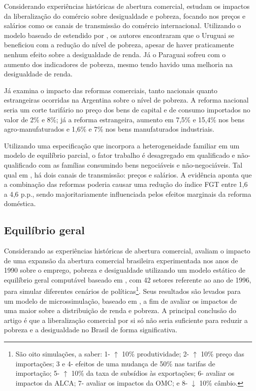 Considerando experiências históricas de abertura comercial, \textcite{borrazetal12} estudam os impactos da liberalização do comércio sobre desigualdade e pobreza, focando nos preços e salários como os canais de transmissão do comércio internacional. Utilizando o modelo baseado de \textcite{dixit80} estendido por \textcite{porto06}, os autores encontraram que o Uruguai se beneficiou com a redução do nível de pobreza, apesar de haver praticamente nenhum efeito sobre a desigualdade de renda. Já o Paraguai sofreu com o aumento dos indicadores de pobreza, mesmo tendo havido uma melhoria na desigualdade de renda.

Já \textcite{porto03} examina o impacto das reformas comerciais, tanto nacionais quanto estrangeiras ocorridas na Argentina sobre o nível de pobreza. A reforma nacional seria um corte tarifário no preço dos bens de capital e de consumo importados no valor de 2\% e 8\%; já a reforma estrangeira, aumento em 7,5\% e 15,4\% nos bens agro-manufaturados e 1,6\% e 7\% nos bens manufaturados industriais.

Utilizando uma especificação que incorpora a heterogeneidade familiar em um modelo de equilíbrio parcial, o fator trabalho é desagregado em qualificado e não-qualificado com as famílias consumindo bens negociáveis e não-negociáveis. Tal qual em \textcite{borrazetal12}, há dois canais de transmissão: preços e salários. A evidência aponta que a combinação das reformas poderia causar uma redução do índice FGT entre 1,6 a 4,6 p.p., sendo majoritariamente influenciada pelos efeitos marginais da reforma doméstica.

\subsection{Equilíbrio geral} \label{subsec:eq_geral}

Considerando as experiências históricas de abertura comercial, \textcite{carneiro06} avaliam o impacto de uma expansão da abertura comercial brasileira experimentada nos anos de 1990 sobre o emprego, pobreza e desigualdade utilizando um modelo estático de equilíbrio geral computável baseado em \textcite{robinson99}, com 42 setores referente ao ano de 1996, para simular diferentes cenários de políticas\footnote{São oito simulações, a saber: 1- $\uparrow$ 10\% produtividade; 2- $\uparrow$ 10\% preço das importações; 3 e 4- efeitos de uma mudança de 50\% nas tarifas de importação; 5- $\uparrow$ 10\% da taxa de subsídios às exportações; 6- avaliar os impactos da ALCA; 7- avaliar os impactos da OMC; e 8- $\downarrow$ 10\% câmbio.}. Seus resultados são levados para um modelo de microssimulação, baseado em \textcite{ganuza07}, a fim de avaliar os impactos de uma maior sobre a distribuição de renda e pobreza. A principal conclusão do artigo é que a liberalização comercial por si só não seria suficiente para reduzir a pobreza e a desigualdade no Brasil de forma significativa.

